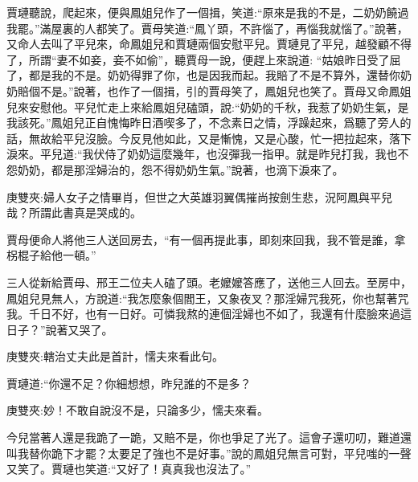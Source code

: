 \begin{parag}
    賈璉聽說，爬起來，便與鳳姐兒作了一個揖，笑道:“原來是我的不是，二奶奶饒過我罷。”滿屋裏的人都笑了。賈母笑道:“鳳丫頭，不許惱了，再惱我就惱了。”說著，又命人去叫了平兒來，命鳳姐兒和賈璉兩個安慰平兒。賈璉見了平兒，越發顧不得了，所謂“妻不如妾，妾不如偷”，聽賈母一說，便趕上來說道: “姑娘昨日受了屈了，都是我的不是。奶奶得罪了你，也是因我而起。我賠了不是不算外，還替你奶奶賠個不是。”說著，也作了一個揖，引的賈母笑了，鳳姐兒也笑了。賈母又命鳳姐兒來安慰他。平兒忙走上來給鳳姐兒磕頭，說:“奶奶的千秋，我惹了奶奶生氣，是我該死。”鳳姐兒正自愧悔昨日酒喫多了，不念素日之情，浮躁起來，爲聽了旁人的話，無故給平兒沒臉。今反見他如此，又是慚愧，又是心酸，忙一把拉起來，落下淚來。平兒道:“我伏侍了奶奶這麼幾年，也沒彈我一指甲。就是昨兒打我，我也不怨奶奶，都是那淫婦治的，怨不得奶奶生氣。”說著，也滴下淚來了。\begin{note}庚雙夾:婦人女子之情畢肖，但世之大英雄羽翼偶摧尚按劍生悲，況阿鳳與平兒哉？所謂此書真是哭成的。\end{note}賈母便命人將他三人送回房去，“有一個再提此事，即刻來回我，我不管是誰，拿柺棍子給他一頓。”
\end{parag}


\begin{parag}
    三人從新給賈母、邢王二位夫人磕了頭。老嬤嬤答應了，送他三人回去。至房中，鳳姐兒見無人，方說道:“我怎麼象個閻王，又象夜叉？那淫婦咒我死，你也幫著咒我。千日不好，也有一日好。可憐我熬的連個淫婦也不如了，我還有什麼臉來過這日子？”說著又哭了。\begin{note}庚雙夾:轄治丈夫此是首計，懦夫來看此句。\end{note}賈璉道:“你還不足？你細想想，昨兒誰的不是多？\begin{note}庚雙夾:妙！不敢自說沒不是，只論多少，懦夫來看。\end{note}今兒當著人還是我跪了一跪，又賠不是，你也爭足了光了。這會子還叨叨，難道還叫我替你跪下才罷？太要足了強也不是好事。”說的鳳姐兒無言可對，平兒嗤的一聲又笑了。賈璉也笑道:“又好了！真真我也沒法了。”
\end{parag}


